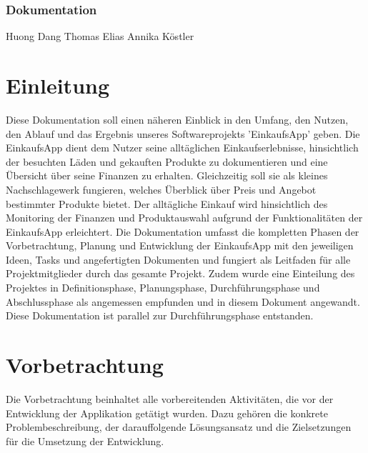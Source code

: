 \documentclass[12pt,a4paper]{article}
\begin{document}
\subsubsection*{Dokumentation}
Huong Dang
\newline
Thomas Elias
\newline
Annika Köstler
\newpage


\section*{Einleitung}
Diese Dokumentation soll einen näheren Einblick in den Umfang, den Nutzen, den Ablauf und das Ergebnis unseres Softwareprojekts 'EinkaufsApp' geben.  
\newline
Die EinkaufsApp dient dem Nutzer seine alltäglichen Einkaufserlebnisse, hinsichtlich der besuchten Läden und gekauften Produkte zu dokumentieren und eine Übersicht über seine Finanzen zu erhalten.
Gleichzeitig soll sie als kleines Nachschlagewerk fungieren, welches Überblick über Preis und Angebot bestimmter Produkte bietet.
Der alltägliche Einkauf wird hinsichtlich des Monitoring der Finanzen und Produktauswahl aufgrund der Funktionalitäten der EinkaufsApp erleichtert.
\newline
Die Dokumentation umfasst die kompletten Phasen der Vorbetrachtung, Planung und Entwicklung der EinkaufsApp mit den jeweiligen Ideen, Tasks und angefertigten Dokumenten und fungiert als Leitfaden für alle Projektmitglieder durch das gesamte Projekt.
\newline
Zudem wurde eine Einteilung des Projektes in Definitionsphase, Planungsphase, Durchführungsphase und Abschlussphase als angemessen empfunden und in diesem Dokument angewandt.
Diese Dokumentation ist parallel zur Durchführungsphase entstanden.

\newpage
\section{Vorbetrachtung}
Die Vorbetrachtung beinhaltet alle vorbereitenden Aktivitäten, die vor der Entwicklung der Applikation getätigt wurden. Dazu gehören die konkrete Problembeschreibung, der darauffolgende Lösungsansatz und die Zielsetzungen für die Umsetzung der Entwicklung.
\end{document}
